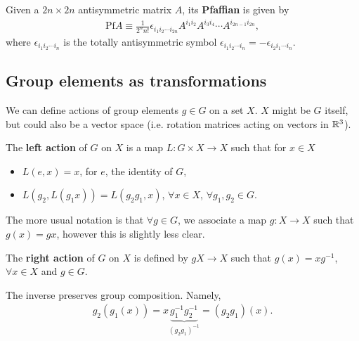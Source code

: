 \begin{definition}
    Given a $2n \times  2n$ antisymmetric matrix $A$, its \textbf{Pfaffian} is given by
    \begin{align}
        \text{Pf} A \equiv \frac{1}{2^{n}n!} \epsilon_{i_1 i_2 \cdots i_{2n}} A^{i_1 i_2} A^{i_3 i_4} \cdots A^{i_{2n-1} i_{2n}}
    ,\end{align}
    where $\epsilon_{i_1 i_2 \cdots i_n}$ is the totally antisymmetric symbol $\epsilon_{i_1 i_2 \cdots i_n} = -\epsilon_{i_2 i_1 \cdots i_n}$.
\end{definition}

\subsection{Group elements as transformations}

We can define actions of group elements $g \in G$ on a set $X$. $X$ might be $G$ itself, but could also be a vector space (i.e. rotation matrices acting on vectors in $\mathbb{R}^3$).

\begin{definition}
    The \textbf{left action} of $G$ on $X$ is a map $L : G \times X \to X$ such that for $x \in X$
    \begin{itemize}
        \item $L \left( e,x \right) = x$, for $e$, the identity of $G$,
    \item $L \left( g_2, L \left( g_1 x \right)  \right) = L \left( g_2 g_1, x \right) $, $\forall x \in X$, $\forall g_1, g_2 \in G$.
    \end{itemize}

\end{definition}

The more usual notation is that $\forall g \in G$, we associate a map $g : X \to X$ such that $g \left( x \right) = g x$, however this is slightly less clear.

\begin{definition}
    The \textbf{right action} of $G$ on $X$ is defined by $g X \to X$ such that $g \left( x \right) = x g^{-1}$, $\forall x \in X$ and $g \in G$.
\end{definition}

The inverse preserves group composition. Namely,
\begin{align}
    g_2 \left( g_1 \left( x \right)  \right) = x \underbrace{g_1^{-1} g_2^{-1}}_{\left( g_2 g_1 \right)^{-1}} = \left( g_2 g_1 \right) \left( x \right) 
.\end{align}

